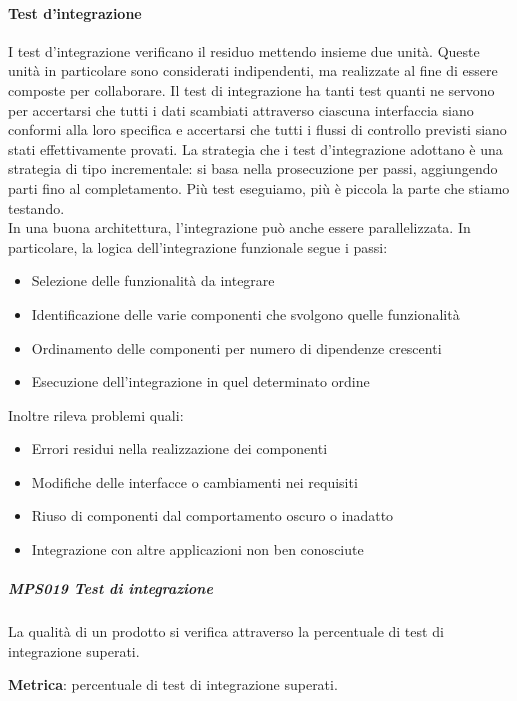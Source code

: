 			\paragraph{Test d'integrazione} \label{testintegrazione}
			I test d'integrazione verificano il residuo mettendo insieme due unità. Queste unità in particolare sono considerati indipendenti, ma realizzate al fine di essere composte per collaborare.
			Il test di integrazione ha tanti test quanti ne servono per accertarsi che tutti i dati scambiati attraverso ciascuna interfaccia siano conformi alla loro specifica e accertarsi che tutti i flussi di controllo previsti siano stati effettivamente provati.
			La strategia che i test d'integrazione adottano è una strategia di tipo incrementale: si basa nella prosecuzione per passi, aggiungendo parti fino al completamento.
			Più test eseguiamo, più è piccola la parte che stiamo testando. \\
			In una buona architettura, l'integrazione può anche essere parallelizzata.
			In particolare, la logica dell'integrazione funzionale segue i passi:
			\begin{itemize}
				\item Selezione delle funzionalità da integrare
				\item Identificazione delle varie componenti che svolgono quelle funzionalità
				\item Ordinamento delle componenti per numero di dipendenze crescenti
				\item Esecuzione dell'integrazione in quel determinato ordine
			\end{itemize}
			Inoltre rileva problemi quali:
			\begin{itemize}
				\item Errori residui nella realizzazione dei componenti
				\item Modifiche delle interfacce o cambiamenti nei requisiti
				\item Riuso di componenti dal comportamento oscuro o inadatto
				\item Integrazione con altre applicazioni non ben conosciute
			\end{itemize}

            \subparagraph{MPS019 Test di integrazione}\label{testintegrazione:met}
            La qualità di un prodotto si verifica attraverso la percentuale di test di integrazione superati.

            \textbf{Metrica}: percentuale di test di integrazione superati.

